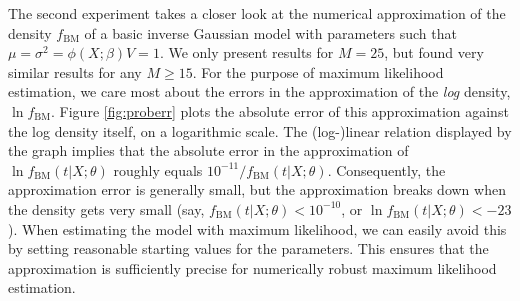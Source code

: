 The second experiment takes a closer look at the numerical approximation of the density $f_{\mathrm{BM}}$ of a basic inverse Gaussian model with parameters such that $\mu=\sigma^{2}=\phi(X;\beta)V=1$. We only present results for $M=25$, but found very similar results for any $M \geq 15$. For the purpose of maximum likelihood estimation, we care most about the errors in the approximation of the {\em log} density, $\ln f_{\mathrm{BM}}$. Figure \ref{fig:proberr} plots the absolute error of this approximation against the log density itself, on a logarithmic scale. The (log-)linear relation displayed by the graph implies that the absolute error in the approximation of $\ln f_{\mathrm{BM}}(t|X;\theta)$ roughly equals $10^{-11}/f_{\mathrm{BM}}(t|X;\theta)$. Consequently, the approximation error is generally small, but the approximation breaks down when the density gets very small (say, $f_{\mathrm{BM}}(t|X;\theta)<10^{-10}$, or $\ln f_{\mathrm{BM}}(t|X;\theta)<-23$). When estimating the model with maximum likelihood, we can easily avoid this by setting reasonable starting values for the parameters. This ensures that the approximation is sufficiently precise for numerically robust maximum likelihood estimation.


